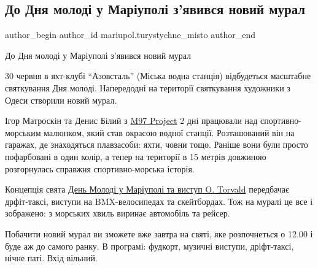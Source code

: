  
 
 
 
 

\subsection{До Дня молоді у Маріуполі з'явився новий мурал}
\label{sec:29_06_2019.fb.mariupol.turystychne_misto.1.den_molodi_novyj_mural}

\ifcmt
 author_begin
   author_id mariupol.turystychne_misto
 author_end
\fi

До Дня молоді у Маріуполі з'явився новий мурал

30 червня в яхт-клубі \enquote{Азовсталь} (Міська водна станція) відбудеться масштабне
святкування Дня молоді. Напередодні на території святкування художники з Одеси
створили новий мурал.

Ігор Матроскін та Денис Білий з \href{https://www.facebook.com/m97project}{M97 Project} 2 дні працювали над
спортивно-морським малюнком, який став окрасою водної станції. Розташований він
на гаражах, де знаходяться плавзасоби: яхти, човни тощо. Раніше вони були
просто пофарбовані в один колір, а тепер на території в 15 метрів довжиною
розгорнулась справжня спортивно-морська історія.

Концепція свята \href{https://www.facebook.com/events/2221152564658956}{День
Молоді у Маріуполі та виступ O. Torvald} передбачає дрфіт-таксі, виступи на
BMX-велосипедах та скейтбордах. Тож на муралі це все і зображено: з морських
хвиль виринає автомобіль та рейсер. 

Побачити новий мурал ви зможете вже завтра на святі, яке розпочнеться о 12.00 і
буде аж до самого ранку. В програмі: фудкорт, музичні виступи, дріфт-таксі,
нічне паті. Вхід вільний.

